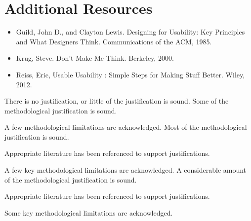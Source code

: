 \documentclass{../../../fal_assignment}
\begin{document}
\section*{Additional Resources}
\begin{itemize}
    \item Guild, John D., and Clayton Lewis. Designing for Usability: Key Principles and What Designers Think. Communications of the ACM, 1985.
    \item Krug, Steve. Don't Make Me Think. Berkeley, 2000. 
    \item Reiss, Eric, Usable Usability : Simple Steps for Making Stuff Better. Wiley, 2012.
\end{itemize}

\rubricyeartwo

\begin{markingrubric}
%
%
        \grade\fail 	There is no justification, or little of the justification is sound.
        \grade 		Some of the methodological justification is sound.
        \par	           A few methodological limitations are acknowledged. 
        \grade 		Most of the methodological justification is sound.
        \par		Appropriate literature has been referenced to support justifications.
        \par 		A few key methodological limitations are acknowledged. 
        \grade 		A considerable amount of the methodological justification is sound.
        \par		Appropriate literature has been referenced to support justifications.
        \par 		Some key methodological limitations are acknowledged. 

\end{markingrubric}
\end{document}
